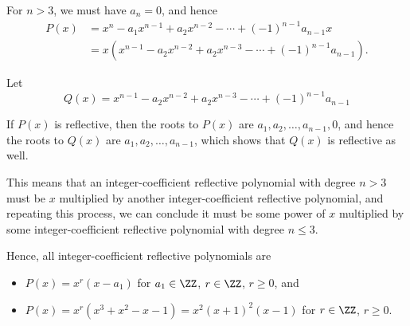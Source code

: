 \begin{enumerate}
          For \(n > 3\), we must have \(a_n = 0\), and hence
          \begin{align*}
              P(x) & = x^n - a_1 x^{n - 1} + a_2 x^{n - 2} - \cdots + (-1)^{n - 1} a_{n - 1} x                     \\
                   & = x \left(x^{n - 1} - a_2 x^{n - 2} + a_2 x^{n - 3} - \cdots + (-1)^{n - 1} a_{n - 1}\right).
          \end{align*}

          Let
          \[
              Q(x) = x^{n - 1} - a_2 x^{n - 2} + a_2 x^{n - 3} - \cdots + (-1)^{n - 1} a_{n - 1}
          \]

          If \(P(x)\) is reflective, then the roots to \(P(x)\) are \(a_1, a_2, \ldots, a_{n - 1}, 0\), and hence the roots to \(Q(x)\) are \(a_1, a_2, \ldots, a_{n - 1}\), which shows that \(Q(x)\) is reflective as well.

          This means that an integer-coefficient reflective polynomial with degree \(n > 3\) must be \(x\) multiplied by another integer-coefficient reflective polynomial, and repeating this process, we can conclude it must be some power of \(x\) multiplied by some integer-coefficient reflective polynomial with degree \(n \leq 3\).

          Hence, all integer-coefficient reflective polynomials are
          \begin{itemize}
              \item \(P(x) = x^r (x - a_1)\) for \(a_1 \in \ZZ\), \(r \in \ZZ\), \(r \geq 0\), and
              \item \(P(x) = x^r (x^3 + x^2 - x - 1) = x^2 (x + 1)^2 (x - 1)\) for \(r \in \ZZ\), \(r \geq 0\).
          \end{itemize}
\end{enumerate}